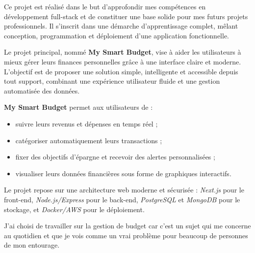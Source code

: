 \begin{tcolorbox}[colback=gray!5!white,colframe=gray!60!black,title=\textbf{Contexte du projet}]
Ce projet est réalisé dans le but d'approfondir mes compétences en développement full-stack et de constituer une base solide pour mes futurs projets professionnels.  
Il s'inscrit dans une démarche d'apprentissage complet, mêlant conception, programmation et déploiement d'une application fonctionnelle.

Le projet principal, nommé \textbf{My Smart Budget}, vise à aider les utilisateurs à mieux gérer leurs finances personnelles grâce à une interface claire et moderne.  
L'objectif est de proposer une solution simple, intelligente et accessible depuis tout support, combinant une expérience utilisateur fluide et une gestion automatisée des données.

\textbf{My Smart Budget} permet aux utilisateurs de :
\begin{itemize}
    \item suivre leurs revenus et dépenses en temps réel ;
    \item catégoriser automatiquement leurs transactions ;
    \item fixer des objectifs d'épargne et recevoir des alertes personnalisées ;
    \item visualiser leurs données financières sous forme de graphiques interactifs.
\end{itemize}

Le projet repose sur une architecture web moderne et sécurisée :  
\textit{Next.js} pour le front-end, \textit{Node.js/Express} pour le back-end, \textit{PostgreSQL} et \textit{MongoDB} pour le stockage, et \textit{Docker/AWS} pour le déploiement.

J'ai choisi de travailler sur la gestion de budget car c'est un sujet qui me concerne au quotidien et que je vois comme un vrai problème pour beaucoup de personnes de mon entourage.
\end{tcolorbox}

